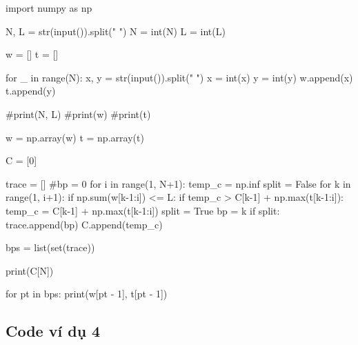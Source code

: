 \documentclass[14pt, a4paper]{article}
\theoremstyle{sltheorem}
\theoremstyle{soltheorem}
\begin{document}
    \begin{python}
import numpy as np
        
N, L = str(input()).split(" ")
N = int(N)
L = int(L)
                    
w = []
t = []
                    
for _ in range(N):
    x, y = str(input()).split(" ")
    x = int(x)
    y = int(y)
    w.append(x)
    t.append(y)
                    
#print(N, L)
#print(w)
#print(t)
                    
w = np.array(w)
t = np.array(t)
                    
C = [0]
                    
trace = []
#bp = 0
for i in range(1, N+1):
    temp_c = np.inf
    split = False
    for k in range(1, i+1):
        if np.sum(w[k-1:i]) <= L:
            if temp_c > C[k-1] + np.max(t[k-1:i]):
                temp_c = C[k-1] + np.max(t[k-1:i])
                split = True
                bp = k
    if split:
        trace.append(bp)
    C.append(temp_c)
                    
bps = list(set(trace))
                    
print(C[N])
                    
for pt in bps:
    print(w[pt - 1], t[pt - 1])
        \end{python}

    \subsection{Code ví dụ 4} \label{code-4-ex-2}
\end{document}
